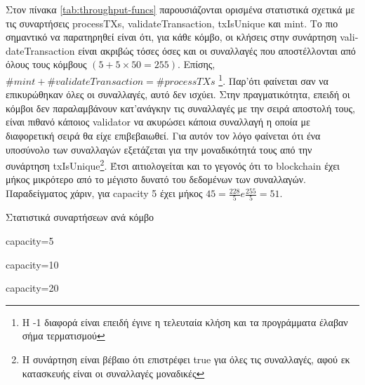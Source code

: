 \documentclass{article}
\newcommand{\eng}[1]{\foreignlanguage{english}{#1}} %
\begin{document}
Στον πίνακα \ref{tab:throughput-funcs} παρουσιάζονται ορισμένα στατιστικά
σχετικά με τις συναρτήσεις \eng{processTXs}, \eng{validateTransaction},
\eng{txIsUnique} και \eng{mint}. Το πιο σημαντικό να παρατηρηθεί είναι ότι, για
κάθε κόμβο, οι κλήσεις στην συνάρτηση \eng{validateTransaction} είναι ακριβώς
τόσες όσες και οι συναλλαγές που αποστέλλονται από όλους τους κόμβους $\left(5
+ 5 \times 50 = 255 \right)$. Επίσης, $\#mint + \#validateTransaction =
\#processTXs$ \footnote{Η -1 διαφορά είναι επειδή έγινε η τελευταία κλήση και τα
προγράμματα έλαβαν σήμα τερματισμού}. Παρ'ότι φαίνεται σαν να επικυρώθηκαν όλες
οι συναλλαγές, αυτό δεν ισχύει. Στην πραγματικότητα, επειδή οι κόμβοι δεν 
παραλαμβάνουν κατ'ανάγκην τις συναλλαγές με την σειρά αποστολή τους, είναι πιθανό
κάποιος \eng{validator} να ακυρώσει κάποια συναλλαγή η οποία με διαφορετική σειρά
θα είχε επιβεβαιωθεί. Για αυτόν τον λόγο φαίνεται ότι ένα υποσύνολο των συναλλαγών
εξετάζεται για την μοναδικότητά τους από την συνάρτηση \eng{txIsUnique}\footnote{Η
συνάρτηση είναι βέβαιο ότι επιστρέφει \eng{true} για όλες τις συναλλαγές, αφού
εκ κατασκευής είναι οι συναλλαγές μοναδικές}. Έτσι αιτιολογείται και το γεγονός
ότι το \eng{blockchain} έχει μήκος μικρότερο από το μέγιστο δυνατό του δεδομένων
των συναλλαγών. Παραδείγματος χάριν, για \eng{capacity 5} έχει μήκος 
$45 = \frac{228}{5} e \frac{255}{5} = 51$.


\begin{table}[ht]
    \caption{Στατιστικά συναρτήσεων ανά κόμβο} 
    \label{tab:throughput-funcs}
    \begin{subtable}{\textwidth}
        \centering
        \caption{\eng{capacity=5}}
        \label{tab:throughput-funcs-1}
    \end{subtable}
\end{table}

\begin{table}[ht]
    \ContinuedFloat
    \begin{subtable}{0.45\textwidth}
        \centering
        \caption{\eng{capacity=10}}
        \label{tab:throughput-funcs-2}
    \end{subtable}
    \hfill
    \begin{subtable}{0.45\textwidth}
        \centering
        \caption{\eng{capacity=20}}
        \label{tab:throughput-funcs-3}
    \end{subtable}
\end{table}
\FloatBarrier
\end{document}
